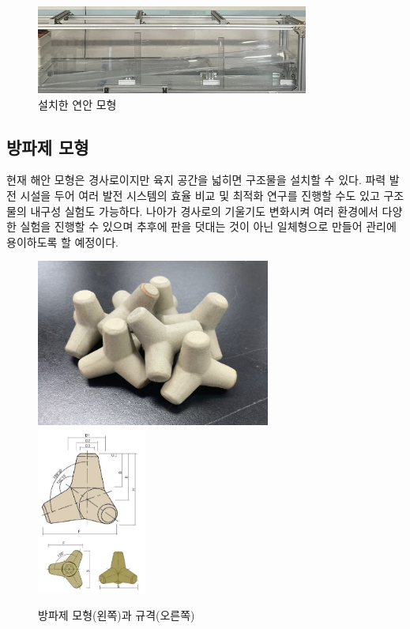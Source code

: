 \begin{figure}[htbp]
	\begin{center}
		\includegraphics[width=0.8\textwidth]{images/slope.jpg}
		\caption{설치한 연안 모형}
		\label{Slope}
	\end{center}
\end{figure}


\subsection{방파제 모형}
현재 해안 모형은 경사로이지만 육지 공간을 넓히면 구조물을 설치할 수 있다. 파력 발전 시설을 두어 여러 발전 시스템의 효율 비교 및 최적화 연구를 진행할 수도 있고 구조물의 내구성 실험도 가능하다. 나아가 경사로의 기울기도 변화시켜 여러 환경에서 다양한 실험을 진행할 수 있으며 추후에 판을 덧대는 것이 아닌 일체형으로 만들어 관리에 용이하도록 할 예정이다.

\begin{figure}[H]
    \centering
    \includegraphics[height=5.5cm]{images/Breakwater.jpg}
    \includegraphics[height=5.5cm]{images/Breakwater(Illustrated).jpg}
    \caption{방파제 모형(왼쪽)과 규격(오른쪽)}
    \label{Braekwater}
\end{figure}

